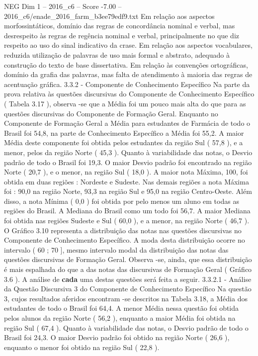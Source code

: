 \begin{textsample}{NEG Dim 1 – 2016\_c6 – Score -7.00 – 2016\_c6/enade\_2016\_farm\_b3ee79edf9.txt}
Em relação aos aspectos morfossintáticos, domínio das regras de concordância nominal e verbal, mas desrespeito às regras de regência nominal e verbal, principalmente no que diz respeito ao uso do sinal indicativo da crase.
Em relação aos aspectos vocabulares, reduzida utilização de palavras de uso mais formal e abstrato, adequado à construção do texto de base dissertativa.
Em relação às convenções ortográficas, domínio da grafia das palavras, mas falta de atendimento à maioria das regras de acentuação gráfica. 3.3.2 - Componente de Conhecimento Específico Na parte da prova relativa às questões discursivas do Componente de Conhecimento Específico ( Tabela 3.17 ), observa -se que a Média foi um pouco mais alta do que para as questões discursivas do Componente de Formação Geral.
Enquanto no Componente de Formação Geral a Média para estudantes de Farmácia de todo o Brasil foi 54,8, na parte de Conhecimento Específico a Média foi 55,2.
A maior Média deste componente foi obtida pelos estudantes da região Sul ( 57,8 ), e a menor, pelos da região Norte ( 45,3 ).
Quanto à variabilidade das notas, o Desvio padrão de todo o Brasil foi 19,3.
O maior Desvio padrão foi encontrado na região Norte ( 20,7 ), e o menor, na região Sul ( 18,0 ).
A maior nota Máxima, 100, foi obtida em duas regiões : Nordeste e Sudeste.
Nas demais regiões a nota Máxima foi : 90,0 na região Norte, 93,3 na região Sul e 95,0 na região Centro-Oeste.
Além disso, a nota Mínima ( 0,0 ) foi obtida por pelo menos um aluno em todas as regiões do Brasil.
A Mediana do Brasil como um todo foi 56,7.
A maior Mediana foi obtida nas regiões Sudeste e Sul ( 60,0 ), e a menor, na região Norte ( 46,7 ).
O Gráfico 3.10 representa a distribuição das notas nas questões discursivas no Componente de Conhecimento Específico.
A moda desta distribuição ocorre no intervalo ( 60 ; 70 ], mesmo intervalo modal da distribuição das notas das questões discursivas de Formação Geral.
Observa -se, ainda, que essa distribuição é mais espalhada do que a das notas das discursivas de Formação Geral ( Gráfico 3.6 ).
A análise de \textbf{cada} uma destas questões será feita a seguir. 3.3.2.1 - Análise da Questão Discursiva 3 do Componente de Conhecimento Específico Na questão 3, cujos resultados aferidos encontram -se descritos na Tabela 3.18, a Média dos estudantes de todo o Brasil foi 64,4.
A menor Média nessa questão foi obtida pelos alunos da região Norte ( 56,2 ), enquanto a maior Média foi obtida na região Sul ( 67,4 ).
Quanto à variabilidade das notas, o Desvio padrão de todo o Brasil foi 24,3.
O maior Desvio padrão foi obtido na região Norte ( 26,6 ), enquanto o menor foi obtido na região Sul ( 22,8 ).

\end{textsample}
